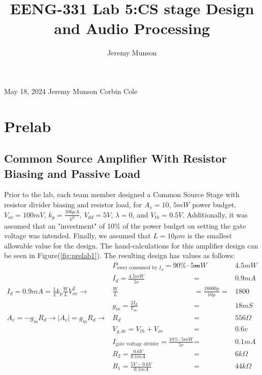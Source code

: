 \documentclass[11pt]{article}
\title{EENG-331 Lab 5:\linebreak \linebreak CS stage Design and Audio Processing}
\author{Jeremy Munson}
\begin{document}
    \null \hfill May 18, 2024\linebreak
    \null \hfill Jeremy Munson\linebreak
    \null \hfill Corbin Cole\linebreak
    

    \vspace{-20px}
	\section{Prelab}
		\FloatBarrier
		\vspace{-5px}
	
	\subsection{Common Source Amplifier With Resistor Biasing and Passive Load}
		Prior to the lab, each team member designed a Common Source Stage with resistor divider biasing and resistor load, for $A_v = 10$, $5mW$ power budget, $V_{ov} = 100mV$, $k_p = \frac{100\mu A}{V^2}$, $V_{dd} = 5V$, $\lambda = 0$, and $V_{th} = 0.5V$. Additionally, it was assumed that an "investment" of 10\% of the power budget on setting the gate voltage was intended. Finally, we assumed that $L = 10\mu m$ is the smallest allowable value for the design. The hand-calculations for this amplifier design can be seen in Figure(\ref{fig:prelab1}). The resulting design has values as follows:\\
		\begin{align}
			\label{eqn:CS_POW_ID} &P_{\text{ower consumed by } I_d} = 90\% \cdot 5mW &=& 4.5mW \\
			\label{eqn:CS_ID} &I_d = \frac{4.5mW}{5v} &=& 0.9mA \\
			\label{eqn:CS_WL} I_d = 0.9mA = \frac{1}{2} k_p \frac{W}{L} V_{ov}^2 \rightarrow &\frac{W}{L} &= \frac{18000\mu}{10\mu} =& 1800 \\
			\label{eqn:CS_gm} &g_m = \frac{2I_d}{V_{ov}} &=& 18mS \\
			\label{eqn:CS_RD} A_v = -g_mR_d \rightarrow |A_v| = g_mR_d \rightarrow &R_d &=& 556 \Omega \\
			\label{eqn:CS_VG} &V_{g,dc} = V_{th} + V_{ov} &=& 0.6v \\
			\label{eqn:CS_GATE_BIAS} &I_{\text{gate voltage divider}} = \frac{10\% \cdot 5mW}{5v} &=& 0.1mA \\
			\label{eqn:CS_R2} &R_2 = \frac{0.6V}{0.1mA} &=& 6k\Omega \\
			\label{eqn:CS_R1} &R_1 = \frac{5V - 0.6V}{0.1mA} &=& 44k\Omega
		\end{align}
\end{document}

